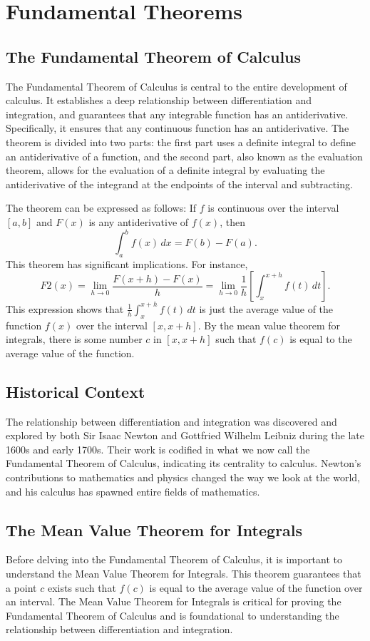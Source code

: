 \documentclass[12pt]{article}
\begin{document}
\section{Fundamental Theorems}
\subsection{The Fundamental Theorem of Calculus}
The Fundamental Theorem of Calculus is central to the entire development of calculus. It establishes a deep relationship between differentiation and integration, and guarantees that any integrable function has an antiderivative. Specifically, it ensures that any continuous function has an antiderivative. The theorem is divided into two parts: the first part uses a definite integral to define an antiderivative of a function, and the second part, also known as the evaluation theorem, allows for the evaluation of a definite integral by evaluating the antiderivative of the integrand at the endpoints of the interval and subtracting.

The theorem can be expressed as follows: If \( f \) is continuous over the interval \([a, b]\) and \( F(x) \) is any antiderivative of \( f(x) \), then
\[
\int^b_a f(x)\,dx = F(b) - F(a).
\]
This theorem has significant implications. For instance,
\[
F2(x) = \lim_{h \to 0} \frac{F(x+h) - F(x)}{h}
= \lim_{h \to 0} \frac{1}{h} \left[ \int^{x+h}_x f(t)\,dt \right].
\]
This expression shows that \( \frac{1}{h} \int^{x+h}_x f(t)\,dt \) is just the average value of the function \( f(x) \) over the interval \([x, x+h]\). By the mean value theorem for integrals, there is some number \( c \) in \([x, x+h]\) such that \( f(c) \) is equal to the average value of the function.

\subsection{Historical Context}
The relationship between differentiation and integration was discovered and explored by both Sir Isaac Newton and Gottfried Wilhelm Leibniz during the late 1600s and early 1700s. Their work is codified in what we now call the Fundamental Theorem of Calculus, indicating its centrality to calculus. Newton’s contributions to mathematics and physics changed the way we look at the world, and his calculus has spawned entire fields of mathematics.

\subsection{The Mean Value Theorem for Integrals}
Before delving into the Fundamental Theorem of Calculus, it is important to understand the Mean Value Theorem for Integrals. This theorem guarantees that a point \( c \) exists such that \( f(c) \) is equal to the average value of the function over an interval. The Mean Value Theorem for Integrals is critical for proving the Fundamental Theorem of Calculus and is foundational to understanding the relationship between differentiation and integration.
\end{document}
